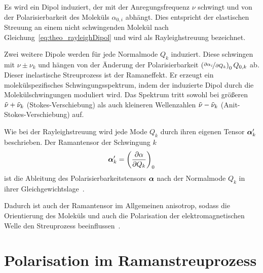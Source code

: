 \documentclass[a4paper,12pt,twoside,parskip=no,headsepline,open=right,ngerman,export]{scrreprt}
\begin{document}
            Es wird ein Dipol induziert, der mit der Anregungsfrequenz $\nu$ schwingt und von der Polarisierbarkeit des Moleküls $\alpha_{0,i}$ abhängt. Dies entspricht der elastischen Streuung an einem nicht schwingenden Molekül nach Gleichung~\ref{eq:theo_rayleighDipol} und wird als Rayleighstreuung bezeichnet.~\cite{chalmers_raman_2006}
            
            Zwei weitere Dipole werden für jede Normalmode $Q_k$ induziert. Diese schwingen mit $\nu\pm\nu_k$ und hängen von der Änderung der Polarisierbarkeit $\left(\nicefrac{\partial \alpha_i}{\partial Q_k}\right)_0 Q_{0,k}$ ab. Dieser inelastische Streuprozess ist der Ramaneffekt. Er erzeugt ein molekülspezifisches Schwingungsspektrum, indem der induzierte Dipol durch die Molekülschwingungen moduliert wird. Das Spektrum tritt sowohl bei größeren 
            $\tilde{\nu}+\tilde{\nu}_k$ (Stokes\hyp{}Verschiebung) als auch kleineren Wellenzahlen $\tilde{\nu}-\tilde{\nu}_k$ (Anit\hyp{}Stokes\hyp{}Verschiebung) auf.~\cite{chalmers_raman_2006, wilson_molecular_1955}

            Wie bei der Rayleighstreuung wird jede Mode $Q_k$ durch ihren eigenen Tensor $\boldsymbol\alpha^\prime_k$ beschrieben. Der Ramantensor der Schwingung $k$
            \begin{equation}
                \boldsymbol\alpha^\prime_k = \left( \frac{\partial \alpha}{\partial Q_k} \right)_0
            \end{equation}
            ist die Ableitung des Polarisierbarkeitstensors $\boldsymbol\alpha$ nach der Normalmode $Q_k$ in ihrer Gleichgewichtslage~\cite{chalmers_raman_2006}. 
            
            Dadurch ist auch der Ramantensor im Allgemeinen anisotrop, sodass die Orientierung des Moleküls und auch die Polarisation der elektromagnetischen Welle den Streuprozess beeinflussen~\cite{chalmers_raman_2006}.
            
        \section{Polarisation im Ramanstreuprozess}\label{sec:theo_raman_mueller}
            
\end{document}
